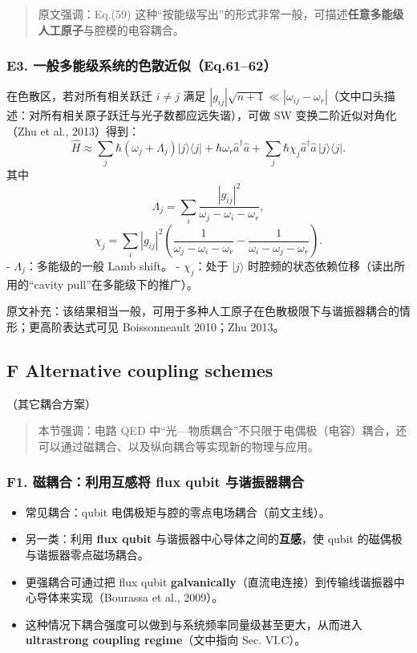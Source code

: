 \documentclass[12pt,a4paper,oneside]{ctexbook}
\providecommand{\tightlist}{%
  \setlength{\itemsep}{0pt}\setlength{\parskip}{0pt}}
\begin{document}
\begin{quote}
原文强调：Eq.(59)
这种``按能级写出''的形式非常一般，可描述\textbf{任意多能级人工原子}与腔模的电容耦合。
\end{quote}

\subsubsection{\texorpdfstring{\textbf{E3.
一般多能级系统的色散近似（Eq.61--62）}}{E3. 一般多能级系统的色散近似（Eq.61--62）}}\label{e3.-ux4e00ux822cux591aux80fdux7ea7ux7cfbux7edfux7684ux8272ux6563ux8fd1ux4f3ceq.6162}

在色散区，若对所有相关跃迁 \(i\neq j\) 满足
\(|g_{ij}|\sqrt{n+1}\ll |\omega_{ij}-\omega_r|\)（文中口头描述：对所有相关原子跃迁与光子数都应远失谐），可做
SW 变换二阶近似对角化（Zhu et al., 2013）得到： \[
\hat H\approx
\sum_j \hbar(\omega_j+\Lambda_j)|j\rangle\langle j|
+\hbar\omega_r\hat a^\dagger\hat a
+\sum_j \hbar\chi_j \hat a^\dagger\hat a\,|j\rangle\langle j|.
\tag{61}
\] 其中 \[
\Lambda_j=\sum_i\frac{|g_{ij}|^2}{\omega_j-\omega_i-\omega_r},
\tag{62a}
\] \[
\chi_j=\sum_i |g_{ij}|^2\left(
\frac{1}{\omega_j-\omega_i-\omega_r}
-\frac{1}{\omega_i-\omega_j-\omega_r}
\right).
\tag{62b}
\] - \(\Lambda_j\)：多能级的一般 Lamb shift。 - \(\chi_j\)：处于
\(|j\rangle\) 时腔频的状态依赖位移（读出所用的``cavity
pull''在多能级下的推广）。

原文补充：该结果相当一般，可用于多种人工原子在色散极限下与谐振器耦合的情形；更高阶表达式可见
Boissonneault 2010；Zhu 2013。


\subsection{F Alternative coupling
schemes}
（其它耦合方案）

\begin{quote}
本节强调：电路 QED
中``光---物质耦合''不只限于电偶极（电容）耦合，还可以通过磁耦合、以及纵向耦合等实现新的物理与应用。
\end{quote}

\subsubsection{\texorpdfstring{\textbf{F1. 磁耦合：利用互感将 flux qubit
与谐振器耦合}}{F1. 磁耦合：利用互感将 flux qubit 与谐振器耦合}}\label{f1.-ux78c1ux8026ux5408ux5229ux7528ux4e92ux611fux5c06-flux-qubit-ux4e0eux8c10ux632fux5668ux8026ux5408}

\begin{itemize}
\tightlist
\item
  常见耦合：qubit 电偶极矩与腔的零点电场耦合（前文主线）。
\item
  另一类：利用 \textbf{flux qubit}
  与谐振器中心导体之间的\textbf{互感}，使 qubit
  的磁偶极与谐振器零点磁场耦合。
\item
  更强耦合可通过把 flux qubit
  \textbf{galvanically}（直流电连接）到传输线谐振器中心导体来实现（Bourassa
  et al., 2009）。
\item
  这种情况下耦合强度可以做到与系统频率同量级甚至更大，从而进入
  \textbf{ultrastrong coupling regime}（文中指向 Sec. VI.C）。
\end{itemize}
\end{document}
